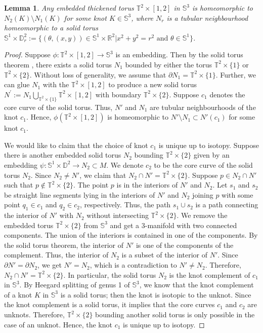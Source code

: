 \documentclass{amsart}
\theoremstyle{plain}
\newtheorem{lem}{Lemma}
\theoremstyle{remark}
\theoremstyle{definition}
\newcommand{\R}{\mathbb{R}}
\newcommand{\s}{\mathbb{S}}
\newcommand{\D}{\mathbb{D}}
\newcommand{\dd}{\partial}
\begin{document}
\begin{lem}\label{Lem:EmThickTorus}
Any embedded thickened torus $\mathbb{T}^2\times [1,2]$ in $\s^3$ is homeomorphic to $N_2(K)\setminus N_1(K)$ for some knot $K \in \s^3$, where $N_r$ is a tubular neighbourhood homeomorphic to a solid torus $\s^1 \times \D^2_r :=\{(\theta, (x,y)) \in \s^1 \times \R^2 | x^2 +y^2 = r^2 \text{ and } \theta \in \s^1\}$.

\end{lem}
\begin{proof}
Suppose $\phi: \mathbb{T}^2 \times [1,2] \to \s^3$ is an embedding. 
Then by the solid torus theorem \cite{STT}, there exists a solid torus $N_1$ bounded by either the torus $\mathbb{T}^2 \times \{1\}$ or $\mathbb{T}^2 \times \{2\}$. 
Without loss of generality, we assume that $\dd N_1 = \mathbb{T}^2 \times \{1\}$. 
Further, we can glue $N_1$ with the $\mathbb{T}^2 \times [1,2]$ to produce a new solid torus $N^{\prime} := N_1 \bigcup_{\mathbb{T}^2\times \{1\}} \mathbb{T}^2 \times [1,2]$ with boundary $\mathbb{T}^2 \times \{2\}$.
Suppose $c_1$ denotes the core curve of the solid torus. 
Thus, $N'$ and $N_1$ are tubular neighbourhoods of the knot $c_1$. 
Hence, $\phi(\mathbb{T}^2 \times [1,2])$ is homeomorphic to $N'\setminus N_1 \subset N'(c_1)$ for some knot $c_1$.  

We would like to claim that the choice of knot $c_1$ is unique up to isotopy.
Suppose there is another embedded solid torus $N_2$ bounding $\mathbb{T}^2 \times \{2\}$ given by an embedding $\psi: \s^1 \times \D^2 \to N_2 \subset M$. 
We denote $c_2$ to be the core curve of the solid torus $N_2$. 
Since $N_2 \neq N'$, we claim that $N_2 \cap N' = \mathbb{T}^2 \times \{2\}$.
Suppose $p \in N_2 \cap N'$ such that $p\notin \mathbb{T}^2 \times \{2\}$. 
The point $p$ is in the interiors of $N'$ and $N_2$. 
Let $s_1$ and $s_2$ be straight line segments lying in the interiors of $N'$ and $N_2$ joining $p$ with some point $q_1 \in c_1$ and $q_2 \in c_2$, respectively. 
Thus, the path $s_1 \cup s_2$ is a path connecting the interior of $N'$ with $N_2$ without intersecting $\mathbb{T}^2\times \{2\}$. 
We remove the embedded torus $\mathbb{T}^2 \times \{2\}$ from $\s^3$ and get a 3-manifold with two connected components. 
The union of the interiors is contained in one of the components. 
By the solid torus theorem, the interior of $N'$ is one of the components of the complement. 
Thus, the interior of $N_2$ is a subset of the interior of $N'$. 
Since $\dd N' =\dd N_2$, we get $N'= N_2$, which is a contradiction to $N' \neq N_2$. 
Therefore,  $N_2 \cap N' = \mathbb{T}^2 \times \{2\}$. 
In particular, the solid torus $N_2 $ is the knot complement of $c_1$ in $\s^3$. 
By Heegard splitting of genus 1 of $\s^3$, we know that the knot complement of a knot $K$ in $\s^3$ is a solid torus; then the knot is isotopic to the unknot.
Since the knot complement is a solid torus, it implies that the core curves $c_1$ and $c_2$ are unknots. Therefore, $\mathbb{T}^2 \times \{2\}$ bounding another solid torus is only possible in the case of an unknot. 
Hence, the knot $c_1$ is unique up to isotopy.
\end{proof}
\end{document}
